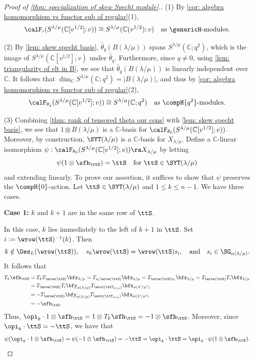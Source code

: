 \documentclass[12pt, reqno]{amsart}
\theoremstyle{plain}
\theoremstyle{definition}
\numberwithin{equation}{section}
\numberwithin{figure}{section}
\numberwithin{table}{section}
\def\C{\mathbb C}
\begin{document}
\begin{proof}[Proof of \protect\cref{thm: specialization of skew Specht module}.]


(1) By \cref{cor: algebra homomorphism vs functor sub of regular}(1), 
\[
\calF_\iota(S^{\lambda/\mu}(\C[v^{1/2}];v)) \cong S^{\lambda/\mu}(\C(v^{1/2});v) \quad\text{as $\genericH$-modules.}
\]


(2) By \cref{lem: skew specht basis},  $\widetilde{\theta_q}(B(\lambda/\mu))$ spans  $S^{\lambda/\mu}(\C;q^2)$, which is the image of $S^{\lambda/\mu}(\C[v^{1/2}];v)$ under $\widetilde{\theta_q}$.
Furthermore, since $q \neq 0$, using \cref{lem: triangularity of elt in  B}, we see that $\widetilde{\theta_q}(B(\lambda/\mu))$ is linearly independent over $\C$. 
It follows that $\dim_{\C}S^{\lambda/\mu}(\C;q^2) = |B(\lambda/\mu)|$, and thus by \cref{cor: algebra homomorphism vs functor sub of regular}(2),
\[
\calF_{\theta_q}(S^{\lambda/\mu}(\C[v^{1/2}];v)) \cong S^{\lambda/\mu}(\C;q^2) \quad\text{as $\compH{q^2}$-modules.}
\]




(3)  
Combining \cref{thm: rank of tensored theta our cons} with \cref{lem: skew specht basis}, we see that $1 \otimes B(\lambda/\mu)$ is a $\C$-basis for $\calF_{\theta_0}(S^{\lambda/\mu}(\C[v^{1/2}];v))$.
Moreover, by construction, $\SYT(\lambda/\mu)$ is a $\C$-basis for $X_{\lambda/\mu}$.
Define a $\C$-linear isomorphism $\psi: \calF_{\theta_0}(S^{\lambda/\mu}(\C[v^{1/2}];v)) \ra X_{\lambda/\mu}$ by letting
\[
\psi(1 \otimes \sfh_{\ttS}) = \ttS \quad\text{for $\ttS \in \SYT(\lambda/\mu)$}
\]
and extending linearly.
To prove our assertion, it suffices to show that $\psi$ preserves the $\compH{0}$-action.
Let $\ttS \in \SYT(\lambda/\mu)$ and $1 \leq k \leq n-1$.
We have three cases.
\smallskip

\textbf{Case 1:} $k$ and $k+1$ are in the same row of $\ttS$.  

In this case, $k$ lies immediately to the left of $k+1$ in $\ttS$.
Set $i := \wrow(\ttS)^{-1}(k)$.
Then
\[
k \notin \Des_L(\wrow(\ttS)),
\quad
s_k \wrow(\ttS) = \wrow(\ttS) s_i,
\quad \text{and} \quad 
s_i \in \SG_{\alpha(\lambda/\mu)}.
\]
It follows that 
\begin{align*}
T_k \sfh_{\ttS} 
& = T_k T_{\wrow(\ttS)} \bfz_{\lambda/\mu}
= T_{s_k\wrow(\ttS)} \bfz_{\lambda/\mu}
= T_{\wrow(\ttS)s_i} \bfz_{\lambda/\mu}
= T_{\wrow(\ttS)} T_i \bfz_{\lambda/\mu} \\
& = T_{\wrow(\ttS)} T_i \bfy_{\alpha(\lambda/\mu)} T_{\wcol(\ttT_{\lambda/\mu})} \bfx_{\alpha(\lambda'/\mu')} \\
& = - T_{\wrow(\ttS)} \bfy_{\alpha(\lambda/\mu)} T_{\wcol(\ttT_{\lambda/\mu})} \bfx_{\alpha(\lambda'/\mu')} \\
& = - \sfh_{\ttS}.
\end{align*}
Thus, $\opi_k \cdot 1 \otimes \sfh_{\ttS} 
= 1 \otimes T_k  \sfh_{\ttS}
= - 1 \otimes \sfh_{\ttS}$.
Moreover, since $\opi_k \cdot \ttS = -\ttS$, we have that
\[
\psi(\opi_k \cdot 1 \otimes \sfh_{\ttS}) 
= \psi(- 1 \otimes \sfh_{\ttS}) 
= - \ttS = \opi_k \cdot \ttS 
= \opi_k \cdot \psi(1 \otimes \sfh_{\ttS}).
\]



\end{proof}
\end{document}
